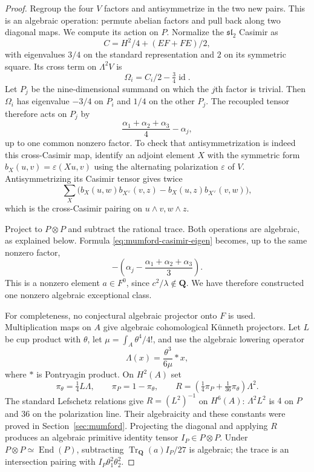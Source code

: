\begin{proof}
Regroup the four $V$ factors and antisymmetrize in the two new pairs.
This is an algebraic operation: permute abelian factors and pull back
along two diagonal maps.  We compute its action on $P$.  Normalize the
$\mathfrak{sl}_2$ Casimir as
\[
 C=H^2/4+(EF+FE)/2,
\]
with eigenvalues $3/4$ on the standard representation and $2$ on its
symmetric square.  Its cross term on $\Lambda^2V$ is
\[
 \Omega_i=C_i/2-\tfrac34\operatorname{id}.
\]
Let $P_j$ be the nine-dimensional summand on which the $j$th factor is
trivial.  Then $\Omega_i$ has eigenvalue $-3/4$ on $P_i$ and $1/4$ on
the other $P_j$.  The recoupled tensor therefore acts on $P_j$ by
\begin{equation}
 \frac{\alpha_1+\alpha_2+\alpha_3}{4}-\alpha_j,
 \label{eq:mumford-casimir-eigen}
\end{equation}
up to one common nonzero factor.  To check that antisymmetrization is
indeed this cross-Casimir map, identify an adjoint element $X$ with the
symmetric form $b_X(u,v)=\varepsilon(Xu,v)$ using the alternating
polarization $\varepsilon$ of $V$.  Antisymmetrizing its Casimir tensor
gives twice
\[
 \sum_X\bigl(b_X(u,w)b_{X^\vee}(v,z)
             -b_X(u,z)b_{X^\vee}(v,w)\bigr),
\]
which is the cross-Casimir pairing on $u\wedge v,w\wedge z$.

Project to $P\otimes P$ and subtract the rational trace.  Both operations
are algebraic, as explained below.  Formula
\eqref{eq:mumford-casimir-eigen} becomes, up to the same nonzero factor,
\[
 -\left(\alpha_j-
      \frac{\alpha_1+\alpha_2+\alpha_3}{3}\right).
\]
This is a nonzero element $a\in F^0$, since $c^2/\lambda\notin\mathbf Q$.
We have therefore constructed one nonzero algebraic exceptional class.

For completeness, no conjectural algebraic projector onto $F$ is used.
Multiplication maps on $A$ give algebraic cohomological K\"unneth
projectors.  Let $L$ be cup product with $\theta$, let
$\mu=\int_A\theta^4/4!$, and use the algebraic lowering operator
\[
 \Lambda(x)=\frac{\theta^3}{6\mu}*x,
\]
where $*$ is Pontryagin product.  On $H^2(A)$ set
\[
 \pi_\theta=\tfrac14L\Lambda,
 \qquad \pi_P=1-\pi_\theta,
 \qquad
 R=\left(\tfrac14\pi_P+\tfrac1{36}\pi_\theta\right)\Lambda^2.
\]
The standard Lefschetz relations give $R=(L^2)^{-1}$ on $H^6(A)$:
$\Lambda^2L^2$ is $4$ on $P$ and $36$ on the polarization line.
Their algebraicity and these constants were proved in Section~\ref{sec:mumford}. Projecting the diagonal and applying $R$
produces an algebraic primitive identity tensor $I_P\in P\otimes P$.
Under $P\otimes P\simeq\operatorname{End}(P)$, subtracting
$\operatorname{Tr}_{\mathbf Q}(a)I_P/27$ is algebraic; the trace is
an intersection pairing with $I_P\theta_1^2\theta_2^2$.


\end{proof}
